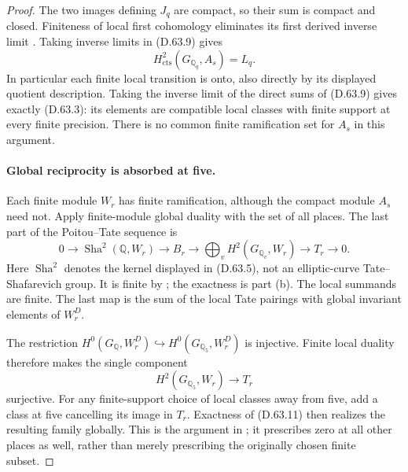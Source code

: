 \begin{proof}
The two images defining \(J_q\) are compact, so their
sum is compact and closed. Finiteness of local first
cohomology eliminates its first derived inverse limit
\cite[I, Corollary 2.3]{DE_MilneADT}. Taking inverse
limits in (D.63.9) gives
\[
                   H^2_{\mathrm{cts}}(G_{\mathbb Q_q},A_s)=L_q.
                                                        \tag{D.63.10}
\]
In particular each finite local transition is onto,
also directly by its displayed quotient description.
Taking the inverse limit of the direct sums of (D.63.9)
gives exactly (D.63.3): its elements are compatible local
classes with finite support at every finite precision.
There is no common finite ramification set for \(A_s\)
in this argument.

\paragraph{Global reciprocity is absorbed at five.}
Each finite module \(W_r\) has finite ramification,
although the compact module \(A_s\) need not.
Apply finite-module global duality with the set of all
places. The last part of the Poitou--Tate sequence is
\[
 0\longrightarrow \operatorname{Sha}^2(\mathbb Q,W_r)
 \longrightarrow B_r
 \longrightarrow\bigoplus_v H^2(G_{\mathbb Q_v},W_r)
 \longrightarrow T_r\longrightarrow0.
                                                        \tag{D.63.11}
\]
Here \(\operatorname{Sha}^2\) denotes the kernel displayed
in (D.63.5), not an elliptic-curve Tate--Shafarevich group.
It is finite by \cite[I, Theorem 4.10(a)]{DE_MilneADT};
the exactness is part (b). The local summands are finite.
The last map is the sum of the local Tate pairings with
global invariant elements of \(W_r^D\).

The restriction
\(H^0(G_{\mathbb Q},W_r^D)\hookrightarrow
  H^0(G_{\mathbb Q_5},W_r^D)\)
is injective. Finite local duality therefore makes the
single component
\[
                  H^2(G_{\mathbb Q_5},W_r)\longrightarrow T_r
                                                        \tag{D.63.12}
\]
surjective. For any finite-support choice of local
classes away from five, add a class at five cancelling
its image in \(T_r\). Exactness of (D.63.11) then
realizes the resulting family globally. This is the
argument in \cite[I, Corollary 4.16 and its proof,
printed p.62]{DE_MilneADT}; it prescribes zero at all
other places as well, rather than merely prescribing
the originally chosen finite subset.


\end{proof}
